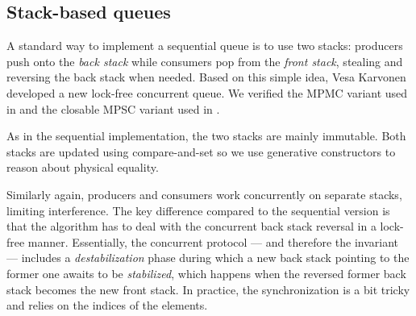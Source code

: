 \subsection{Stack-based queues}

A standard way to implement a sequential queue is to use two stacks: producers push onto the \emph{back stack} while consumers pop from the \emph{front stack}, stealing and reversing the back stack when needed.
Based on this simple idea, Vesa Karvonen developed a new lock-free concurrent queue.
We verified the MPMC variant used in \Picos and the closable MPSC variant used in \Picos.

As in the sequential implementation, the two stacks are mainly immutable.
Both stacks are updated using compare-and-set so we use generative constructors to reason about physical equality.

Similarly again, producers and consumers work concurrently on separate stacks, limiting interference.
The key difference compared to the sequential version is that the algorithm has to deal with the concurrent back stack reversal in a lock-free manner.
Essentially, the concurrent protocol --- and therefore the \Iris invariant --- includes a \emph{destabilization} phase during which a new back stack pointing to the former one awaits to be \emph{stabilized}, which happens when the reversed former back stack becomes the new front stack.
In practice, the synchronization is a bit tricky and relies on the indices of the elements.

